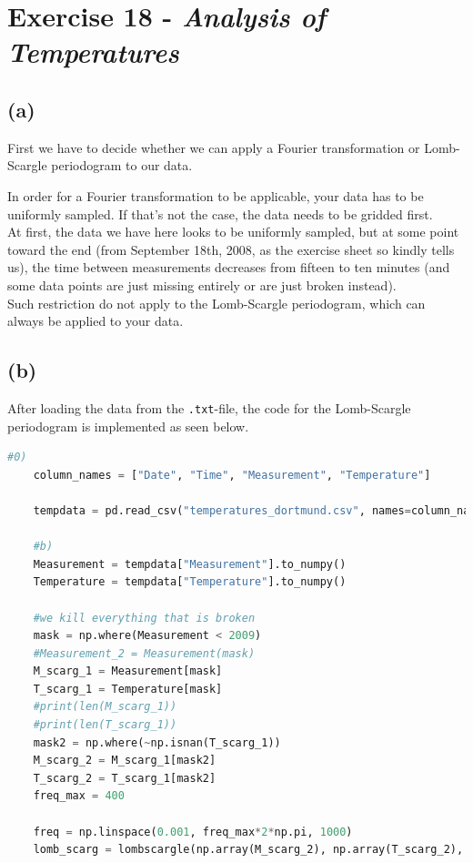 \section*{Exercise 18 - \textit{Analysis of Temperatures}}

\subsection*{(a)}

First we have to decide whether we can apply a Fourier transformation or Lomb-Scargle periodogram to our data.

In order for a Fourier transformation to be applicable, your data has to be uniformly sampled. If that's not the case, the data needs to be gridded
first. \\

At first, the data we have here looks to be uniformly sampled, but at some point toward the end (from September 18th, 2008, as the exercise sheet so kindly tells us),
the time between measurements decreases from fifteen to ten minutes
(and some data points are just missing entirely or are just broken instead). \\

Such restriction do not apply to the Lomb-Scargle periodogram, which can always be applied to your data.

\subsection*{(b)}

After loading the data from the \texttt{.txt}-file, the code for the Lomb-Scargle periodogram is implemented as seen below.

\begin{lstlisting}[language = Python, caption={Implementation of the Lomb-Scagle periodogram}, label = {list:lombscargle}]
    #0)
    column_names = ["Date", "Time", "Measurement", "Temperature"]
    
    tempdata = pd.read_csv("temperatures_dortmund.csv", names=column_names, sep=",", skiprows=1)
    
    #b)
    Measurement = tempdata["Measurement"].to_numpy()
    Temperature = tempdata["Temperature"].to_numpy()
    
    #we kill everything that is broken
    mask = np.where(Measurement < 2009)
    #Measurement_2 = Measurement(mask)
    M_scarg_1 = Measurement[mask] 
    T_scarg_1 = Temperature[mask]
    #print(len(M_scarg_1))
    #print(len(T_scarg_1))
    mask2 = np.where(~np.isnan(T_scarg_1))
    M_scarg_2 = M_scarg_1[mask2]
    T_scarg_2 = T_scarg_1[mask2]
    freq_max = 400
    
    freq = np.linspace(0.001, freq_max*2*np.pi, 1000) 
    lomb_scarg = lombscargle(np.array(M_scarg_2), np.array(T_scarg_2), freq, normalize=True)
    
\end{lstlisting}

